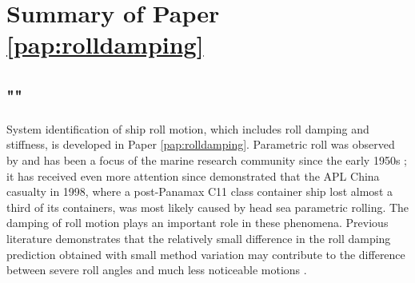 \section{Summary of Paper \ref{pap:rolldamping}}
\subsection*{""}
System identification of ship roll motion, which includes roll damping and stiffness, is developed in Paper \ref{pap:rolldamping}. Parametric roll was observed by \textcite{froude_rolling_1861} and has been a focus of the marine research community since the early 1950s \parencite{galeazzi_early_2013}; it has received even more attention since \textcite{france_investigation_2001} demonstrated that the APL China casualty in 1998, where a post-Panamax C11 class container ship lost almost a third of its containers, was most likely caused by head sea parametric rolling. The damping of roll motion plays an important role in these phenomena. Previous literature demonstrates that the relatively small difference in the roll damping prediction obtained with small method variation may contribute to the difference between severe roll angles and much less noticeable motions \cite{soder_ikeda_2019}.

